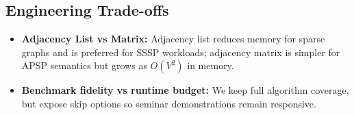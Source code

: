 \subsection{Engineering Trade-offs}
\begin{itemize}
	\item \textbf{Adjacency List vs Matrix:}
	Adjacency list reduces memory for sparse graphs and is preferred for SSSP workloads; adjacency matrix is simpler for APSP semantics but grows as $O(V^2)$ in memory.
	\item \textbf{Benchmark fidelity vs runtime budget:}
	We keep full algorithm coverage, but expose skip options so seminar demonstrations remain responsive.
\end{itemize}